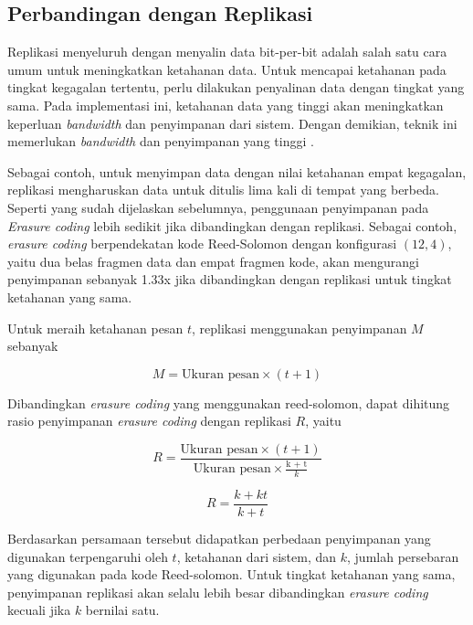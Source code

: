\subsection{Perbandingan dengan Replikasi}

Replikasi menyeluruh dengan menyalin data bit-per-bit adalah salah satu cara umum untuk meningkatkan ketahanan data. Untuk mencapai ketahanan pada tingkat kegagalan tertentu, perlu dilakukan penyalinan data dengan tingkat yang sama. Pada implementasi ini, ketahanan data yang tinggi akan meningkatkan keperluan \textit{bandwidth} dan penyimpanan dari sistem. Dengan demikian, teknik ini memerlukan \textit{bandwidth} dan penyimpanan yang tinggi  \parencite{weatherspoon2002erasure}.

Sebagai contoh, untuk menyimpan data dengan nilai ketahanan empat kegagalan, replikasi mengharuskan data untuk ditulis lima kali di tempat yang berbeda. Seperti yang sudah dijelaskan sebelumnya, penggunaan penyimpanan pada \textit{Erasure coding} lebih sedikit jika dibandingkan dengan replikasi. Sebagai contoh, \textit{erasure coding} berpendekatan kode Reed-Solomon dengan konfigurasi $(12, 4)$, yaitu dua belas fragmen data dan empat fragmen kode, akan mengurangi penyimpanan sebanyak 1.33x jika dibandingkan dengan replikasi untuk tingkat ketahanan yang sama.

Untuk meraih ketahanan pesan $t$, replikasi menggunakan penyimpanan $M$ sebanyak

\[M = \text{Ukuran pesan} \times (t + 1)\]

Dibandingkan \textit{erasure coding} yang menggunakan reed-solomon, dapat dihitung rasio penyimpanan \textit{erasure coding} dengan replikasi $R$, yaitu

\[R = \frac{\text{Ukuran pesan} \times (t + 1)}{\text{Ukuran pesan} \times \frac{\text{k + t}}{k}} \]


\[R = \frac{k + kt}{k + t}\]

Berdasarkan persamaan tersebut didapatkan perbedaan penyimpanan yang digunakan terpengaruhi oleh $t$, ketahanan dari sistem, dan $k$, jumlah persebaran yang digunakan pada kode Reed-solomon. Untuk tingkat ketahanan yang sama, penyimpanan replikasi akan selalu lebih besar dibandingkan \textit{erasure coding} kecuali jika $k$ bernilai satu.

